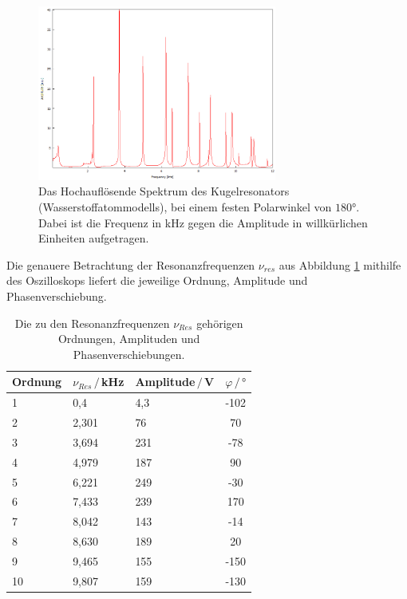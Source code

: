 \begin{figure}
    \center
    \includegraphics[width=0.7\textwidth]{data/Wasserstoffatom/Ohne_Ring/Spektrum_180_first.png}%
    \caption{Das Hochauflösende Spektrum des Kugelresonators (Wasserstoffatommodells), bei einem 
    festen Polarwinkel von $180°$. Dabei ist die Frequenz in kHz gegen die Amplitude in willkürlichen Einheiten aufgetragen.}
    \label{fig:kugel_res}
\end{figure}

Die genauere Betrachtung der Resonanzfrequenzen $\nu_{res}$ aus Abbildung \ref{fig:kugel_res} mithilfe des Oszilloskops
liefert die jeweilige Ordnung, Amplitude und Phasenverschiebung.

\begin{table}[H]
    \center
    \caption{Die zu den Resonanzfrequenzen $\nu_{Res}$ gehörigen Ordnungen, Amplituden und Phasenverschiebungen.}
    \begin{tabular}{l l l c}
        \toprule
        Ordnung & $\nu_{Res}\,/\,$kHz & Amplitude$\,/\,$V & $\varphi\,/\,°$\\
        \midrule
        1 &0,4   &4,3  & -102  \\
        2 &2,301 &76   &   70  \\
        3 &3,694 &231  &  -78  \\
        4 &4,979 &187  &   90  \\
        5 &6,221 &249  &  -30  \\
        6 &7,433 &239  &  170  \\
        7 &8,042 &143  &  -14  \\
        8 &8,630 &189  &   20  \\
        9 &9,465 &155  & -150  \\
        10&9,807 &159  & -130  \\
        \bottomrule
    \end{tabular}
\end{table}


